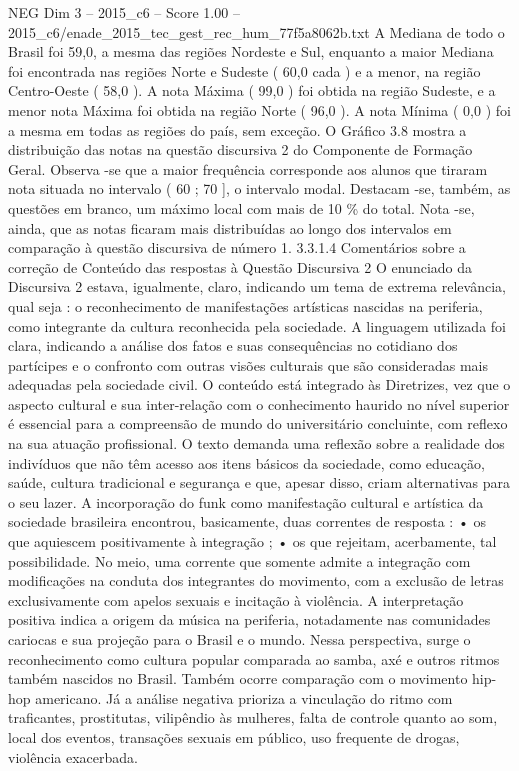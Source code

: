 \begin{textsample}{NEG Dim 3 – 2015\_c6 – Score 1.00 – 2015\_c6/enade\_2015\_tec\_gest\_rec\_hum\_77f5a8062b.txt}
A Mediana de todo o Brasil foi 59,0, a mesma das regiões Nordeste e Sul, enquanto a maior Mediana foi encontrada nas regiões Norte e Sudeste ( 60,0 cada ) e a menor, na região Centro-Oeste ( 58,0 ).
A nota Máxima ( 99,0 ) foi obtida na região Sudeste, e a menor nota Máxima foi obtida na região Norte ( 96,0 ).
A nota Mínima ( 0,0 ) foi a mesma em todas as regiões do país, sem exceção.
O Gráfico 3.8 mostra a distribuição das notas na questão discursiva 2 do Componente de Formação Geral.
Observa -se que a maior frequência corresponde aos alunos que tiraram nota situada no intervalo ( 60 ; 70 ], o intervalo modal.
Destacam -se, também, as questões em branco, um máximo local com mais de 10 \% do total.
Nota -se, ainda, que as notas ficaram mais distribuídas ao longo dos intervalos em comparação à questão discursiva de número 1. 3.3.1.4 Comentários sobre a correção de Conteúdo das respostas à Questão Discursiva 2 O enunciado da Discursiva 2 estava, igualmente, claro, indicando um tema de extrema relevância, qual seja : o reconhecimento de manifestações artísticas nascidas na periferia, como integrante da cultura reconhecida pela sociedade.
A linguagem utilizada foi clara, indicando a análise dos fatos e suas consequências no cotidiano dos partícipes e o confronto com outras visões culturais que são consideradas mais adequadas pela sociedade civil.
O conteúdo está integrado às Diretrizes, vez que o aspecto cultural e sua inter-relação com o conhecimento haurido no nível superior é essencial para a compreensão de mundo do universitário concluinte, com reflexo na sua atuação profissional.
O texto demanda uma reflexão sobre a realidade dos indivíduos que não têm acesso aos itens básicos da sociedade, como educação, saúde, cultura tradicional e segurança e que, apesar disso, criam alternativas para o seu lazer.
A incorporação do funk como manifestação cultural e artística da sociedade brasileira encontrou, basicamente, duas correntes de resposta : • os que aquiescem positivamente à integração ; • os que rejeitam, acerbamente, tal possibilidade.
No meio, uma corrente que somente admite a integração com modificações na conduta dos integrantes do movimento, com a exclusão de letras exclusivamente com apelos sexuais e incitação à violência.
A interpretação positiva indica a origem da música na periferia, notadamente nas comunidades cariocas e sua projeção para o Brasil e o mundo.
Nessa perspectiva, surge o reconhecimento como cultura popular comparada ao samba, axé e outros ritmos também nascidos no Brasil.
Também ocorre comparação com o movimento hip-hop americano.
Já a análise negativa prioriza a vinculação do ritmo com traficantes, prostitutas, vilipêndio às mulheres, falta de controle quanto ao som, local dos eventos, transações sexuais em público, uso frequente de drogas, violência exacerbada.

\end{textsample}
